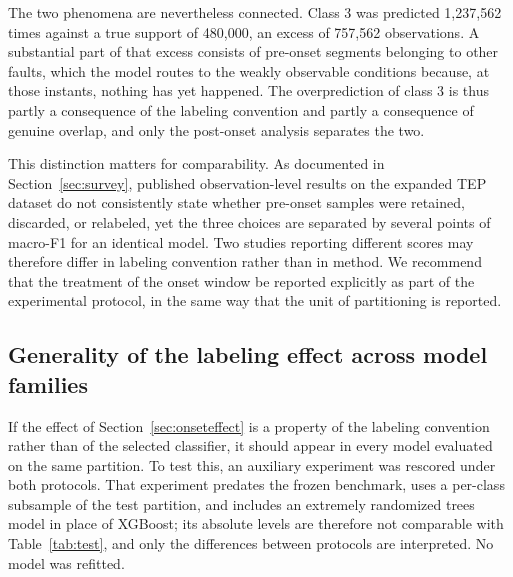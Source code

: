 \documentclass[10pt,twocolumn,a4paper]{article}
\begin{document}
The two phenomena are nevertheless connected. Class 3 was predicted 1,237,562
times against a true support of 480,000, an excess of 757,562 observations. A
substantial part of that excess consists of pre-onset segments belonging to
other faults, which the model routes to the weakly observable conditions
because, at those instants, nothing has yet happened. The overprediction of
class 3 is thus partly a consequence of the labeling convention and partly a
consequence of genuine overlap, and only the post-onset analysis separates the
two.

This distinction matters for comparability. As documented in
Section~\ref{sec:survey}, published observation-level results on the expanded
TEP dataset do not consistently state whether pre-onset samples were retained,
discarded, or relabeled, yet the three choices are separated by several points
of macro-F1 for an identical model. Two studies reporting different scores may
therefore differ in labeling convention rather than in method. We recommend
that the treatment of the onset window be reported explicitly as part of the
experimental protocol, in the same way that the unit of partitioning is
reported.

\subsection{Generality of the labeling effect across model families}
\label{sec:generality}

If the effect of Section~\ref{sec:onseteffect} is a property of the labeling
convention rather than of the selected classifier, it should appear in every
model evaluated on the same partition. To test this, an auxiliary experiment
was rescored under both protocols. That experiment predates the frozen
benchmark, uses a per-class subsample of the test partition, and includes an
extremely randomized trees model in place of XGBoost; its absolute levels are
therefore not comparable with Table~\ref{tab:test}, and only the differences
between protocols are interpreted. No model was refitted.
\end{document}
